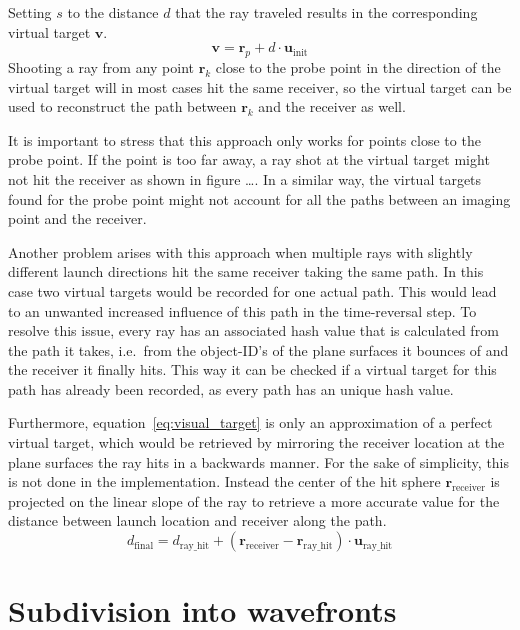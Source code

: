 Setting \(s\) to the distance \(d\) that the ray traveled results in the corresponding virtual target \(\mathbf{v}\).
\begin{equation}\label{eq:visual_target}
    \mathbf{v} = \mathbf{r}_p + d \cdot \mathbf{u}_{\text{init}}
\end{equation}
Shooting a ray from any point \(\mathbf{r}_k\) close to the probe point in the direction of the virtual target will in most cases hit the same receiver, so the virtual target can be used to reconstruct the path between \(\mathbf{r}_k\) and the receiver as well.

It is important to stress that this approach only works for points close to the probe point.
If the point is too far away, a ray shot at the virtual target might not hit the receiver as shown in figure \ldots.
In a similar way, the virtual targets found for the probe point might not account for all the paths between an imaging point and the receiver.

Another problem arises with this approach when multiple rays with slightly different launch directions hit the same receiver taking the same path.
In this case two virtual targets would be recorded for one actual path.
This would lead to an unwanted increased influence of this path in the time-reversal step.
To resolve this issue, every ray has an associated hash value that is calculated from the path it takes, i.e.~from the object-ID's of the plane surfaces it bounces of and the receiver it finally hits.
This way it can be checked if a virtual target for this path has already been recorded, as every path has an unique hash value.

Furthermore, equation~\eqref{eq:visual_target} is only an approximation of a perfect virtual target, which would be retrieved by mirroring the receiver location at the plane surfaces the ray hits in a backwards manner.
For the sake of simplicity, this is not done in the implementation.
Instead the center of the hit sphere \(\mathbf{r}_{\text{receiver}}\) is projected on the linear slope of the ray to retrieve a more accurate value for the distance between launch location and receiver along the path.
\begin{equation}
    d_{\text{final}} = d_{\text{ray\_hit}} +  (\mathbf{r}_{\text{receiver}} - \mathbf{r}_{\text{ray\_hit}}) \cdot \mathbf{u}_{\text{ray\_hit}}
\end{equation}

\section{Subdivision into wavefronts}\label{section:subdivision_into_wavefronts}

